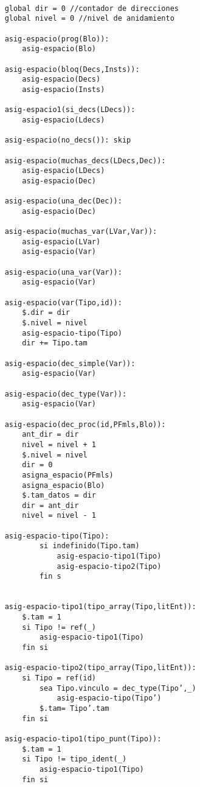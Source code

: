 \begin{lstlisting}

    global dir = 0 //contador de direcciones
    global nivel = 0 //nivel de anidamiento
    
    asig-espacio(prog(Blo)):
        asig-espacio(Blo)

    asig-espacio(bloq(Decs,Insts)):
        asig-espacio(Decs)
        asig-espacio(Insts)
    
    asig-espacio1(si_decs(LDecs)):
        asig-espacio(Ldecs)
    
    asig-espacio(no_decs()): skip
    
    asig-espacio(muchas_decs(LDecs,Dec)):
        asig-espacio(LDecs)
        asig-espacio(Dec)
    
    asig-espacio(una_dec(Dec)):
        asig-espacio(Dec)

    asig-espacio(muchas_var(LVar,Var)):
        asig-espacio(LVar)
        asig-espacio(Var)

    asig-espacio(una_var(Var)):
        asig-espacio(Var)
    
    asig-espacio(var(Tipo,id)):
        $.dir = dir
        $.nivel = nivel
        asig-espacio-tipo(Tipo)
        dir += Tipo.tam
    
    asig-espacio(dec_simple(Var)):
        asig-espacio(Var)

    asig-espacio(dec_type(Var)):
        asig-espacio(Var)
    
    asig-espacio(dec_proc(id,PFmls,Blo)):
        ant_dir = dir 
        nivel = nivel + 1
        $.nivel = nivel
        dir = 0 
        asigna_espacio(PFmls)
        asigna_espacio(Blo)
        $.tam_datos = dir 
        dir = ant_dir 
        nivel = nivel - 1 
        
    asig-espacio-tipo(Tipo):
            si indefinido(Tipo.tam) 
                asig-espacio-tipo1(Tipo) 
                asig-espacio-tipo2(Tipo)
            fin s

            
    asig-espacio-tipo1(tipo_array(Tipo,litEnt)):
        $.tam = 1
        si Tipo != ref(_)
            asig-espacio-tipo1(Tipo)
        fin si

    asig-espacio-tipo2(tipo_array(Tipo,litEnt)):
        si Tipo = ref(id)
            sea Tipo.vinculo = dec_type(Tipo’,_)
                asig-espacio-tipo(Tipo’) 
            $.tam= Tipo’.tam
        fin si 

    asig-espacio-tipo1(tipo_punt(Tipo)):
        $.tam = 1
        si Tipo != tipo_ident(_)
            asig-espacio-tipo1(Tipo)
        fin si


\end{lstlisting}

